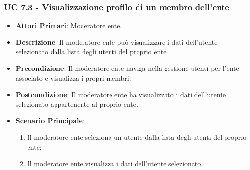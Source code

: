 			\subsubsection{UC 7.3 - Visualizzazione profilo di un membro dell'ente}
			\begin{itemize}
				\item \textbf{Attori Primari}: Moderatore ente.
				\item \textbf{Descrizione}: Il moderatore ente può visualizzare i dati dell'utente selezionato dalla lista degli utenti del proprio ente.
				\item \textbf{Precondizione}: Il moderatore ente naviga nella gestione utenti per l'ente associato e visualizza i propri membri.
				\item \textbf{Postcondizione}: Il moderatore ente ha visualizzato i dati dell'utente selezionato appartenente al proprio ente.
				\item \textbf{Scenario Principale}:
				\begin{enumerate}
					\item{Il moderatore ente seleziona un utente dalla lista degli utenti del proprio ente;}
					\item{Il moderatore ente visualizza i dati dell'utente selezionato.}
				\end{enumerate}
			\end{itemize}


